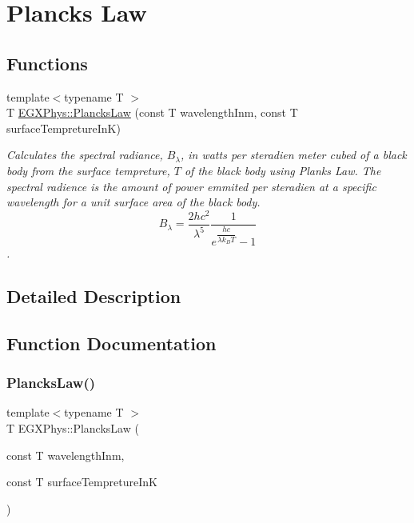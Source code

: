 \hypertarget{group___e_g_x_phys-_electrodynamics-_black_body-_plancks_law}{}\section{Planck\textquotesingle{}s Law}
\label{group___e_g_x_phys-_electrodynamics-_black_body-_plancks_law}
\subsection*{Functions}
\begin{DoxyCompactItemize}
\item 
{\footnotesize template$<$typename T $>$ }\\T \mbox{\hyperlink{group___e_g_x_phys-_electrodynamics-_black_body-_plancks_law_ga44d8dc3e072ffc7d860cd8f07463f091}{E\+G\+X\+Phys\+::\+Plancks\+Law}} (const T wavelength\+Inm, const T surface\+Tempreture\+InK)
\begin{DoxyCompactList}\small\item\em Calculates the spectral radiance, $B_{\lambda}$, in watts per steradien meter cubed of a black body from the surface tempreture, $T$ of the black body using Plank\textquotesingle{}s Law. The spectral radience is the amount of power emmited per steradien at a specific wavelength for a unit surface area of the black body. \[ B_{\lambda} = \dfrac{2 h c^2}{\lambda^5} \dfrac{1}{e^{\dfrac{hc}{\lambda k_B T}} - 1} \]. \end{DoxyCompactList}\end{DoxyCompactItemize}


\subsection{Detailed Description}


\subsection{Function Documentation}
\mbox{\label{group___e_g_x_phys-_electrodynamics-_black_body-_plancks_law_ga44d8dc3e072ffc7d860cd8f07463f091}} 
\subsubsection{\texorpdfstring{Plancks\+Law()}{PlancksLaw()}}
{\footnotesize\ttfamily template$<$typename T $>$ \\
T E\+G\+X\+Phys\+::\+Plancks\+Law (\begin{DoxyParamCaption}\item[{const T}]{wavelength\+Inm,  }\item[{const T}]{surface\+Tempreture\+InK }\end{DoxyParamCaption})}



